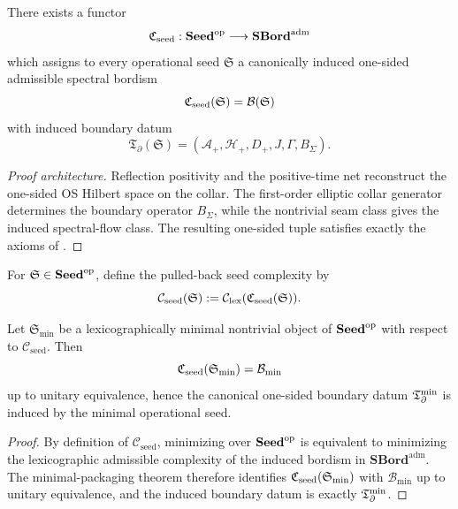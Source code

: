 \begin{theorem}
\label{thm:operational-collar-completion}
There exists a functor
\[
\mathfrak C_{\mathrm{seed}}:\mathbf{Seed}^{\mathrm{op}}\longrightarrow \mathbf{SBord}^{\mathrm{adm}}
\]
which assigns to every operational seed $\mathfrak S$ a canonically induced one-sided admissible
spectral bordism
\[
\mathfrak C_{\mathrm{seed}}(\mathfrak S)=\mathcal B(\mathfrak S)
\]
with induced boundary datum
\[
\mathfrak T_{\partial}(\mathfrak S)=(\mathcal A_+,\mathcal H_+,D_+,J,\Gamma,B_\Sigma).
\]
\end{theorem}

\begin{proof}[Proof architecture]
Reflection positivity and the positive-time net reconstruct the one-sided OS Hilbert space on the
collar. The first-order elliptic collar generator determines the boundary operator $B_\Sigma$,
while the nontrivial seam class gives the induced spectral-flow class. The resulting one-sided
tuple satisfies exactly the axioms of .
\end{proof}

\begin{definition}
\label{def:operational-seed-complexity}
For $\mathfrak S\in\mathbf{Seed}^{\mathrm{op}}$, define the pulled-back seed complexity by
\[
\mathcal C_{\mathrm{seed}}(\mathfrak S):=\mathcal C_{\mathrm{lex}}(\mathfrak C_{\mathrm{seed}}(\mathfrak S)).
\]
\end{definition}

\begin{corollary}
\label{cor:minimal-operational-seed}
Let $\mathfrak S_{\min}$ be a lexicographically minimal nontrivial object of $\mathbf{Seed}^{\mathrm{op}}$ with respect
to $\mathcal C_{\mathrm{seed}}$. Then
\[
\mathfrak C_{\mathrm{seed}}(\mathfrak S_{\min})=\mathcal B_{\min}
\]
up to unitary equivalence, hence the canonical one-sided boundary datum $\mathfrak T_{\partial}^{\min}$ is induced by the
minimal operational seed.
\end{corollary}

\begin{proof}
By definition of $\mathcal C_{\mathrm{seed}}$, minimizing over $\mathbf{Seed}^{\mathrm{op}}$ is equivalent to minimizing
the lexicographic admissible complexity of the induced bordism in
$\mathbf{SBord}^{\mathrm{adm}}$. The minimal-packaging theorem therefore identifies
$\mathfrak C_{\mathrm{seed}}(\mathfrak S_{\min})$ with $\mathcal B_{\min}$ up to unitary equivalence, and the induced
boundary datum is exactly $\mathfrak T_{\partial}^{\min}$.
\end{proof}


